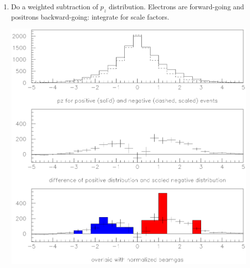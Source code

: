\begin{slide*}
\begin{minipage}[t]{\linewidth}
\begin{flushleft}
\begin{enumerate}
  \item Do a weighted subtraction of $p_z$ distribution. Electrons
are forward-going and positrons backward-going: integrate for scale
factors. \\
  \begin{center}
    \includegraphics[width=0.5\linewidth]{beamgas_normalization.eps}
  \end{center}

\end{enumerate}
\end{flushleft}

\end{minipage}

\end{slide*}



